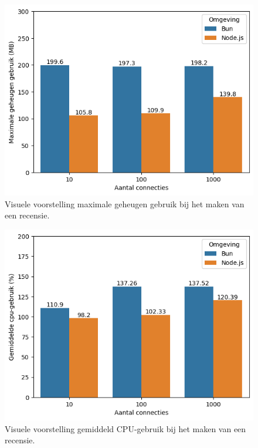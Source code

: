     \begin{figure}[H]
      \centering
      \includegraphics{graphics/PostMySqlRAM.png}
      \caption{\label{fig:postgeheugennmysql}Visuele voorstelling maximale geheugen gebruik bij het maken van een recensie.}
    \end{figure}
    \begin{figure}[H]
      \centering
      \includegraphics{graphics/PostMySqlCpu.png}
      \caption{\label{fig:postcpymysql}Visuele voorstelling gemiddeld CPU-gebruik bij het maken van een recensie.}
    \end{figure}

